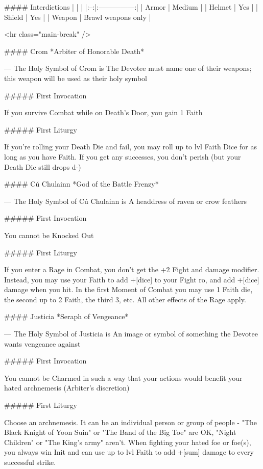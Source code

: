 #### Interdictions
| | |
|:--:|:---------------:|
| Armor | Medium |
| Helmet | Yes |
| Shield | Yes |
| Weapon | Brawl weapons only |

<hr class="main-break" />

#### Crom
*Arbiter of Honorable Death*

---
The Holy Symbol of Crom is The Devotee must name one of their weapons; this weapon will be used as their holy symbol

##### First Invocation

If you survive Combat while on Death's Door, you gain 1 Faith

##### First Liturgy

If you're rolling your Death Die and fail, you may roll up to {lvl} Faith Dice for as long as you have Faith.  If you get any successes, you don't perish (but your Death Die still drops {d-})




#### Cú Chulainn
*God of the Battle Frenzy*

---
The Holy Symbol of Cú Chulainn is A headdress of raven or crow feathers

##### First Invocation

You cannot be Knocked Out

##### First Liturgy

If you enter a Rage in Combat, you don't get the +2 Fight and damage modifier.  Instead, you may use your Faith to add +[dice] to your Fight {ro}, and add +[dice] damage when you hit.  In the first Moment of Combat you may use 1 Faith die, the second up to 2 Faith, the third 3, etc. All other effects of the Rage apply.




#### Justicia
*Seraph of Vengeance*

---
The Holy Symbol of Justicia is An image or symbol of something the Devotee wants vengeance against

##### First Invocation

You cannot be Charmed in such a way that your actions would benefit your hated archnemesis (Arbiter's discretion)

##### First Liturgy

Choose an archnemesis.  It can be an individual person or group of people  - "The Black Knight of Yoon Suin" or "The Band of the Big Toe" are OK,  "Night Children" or "The King's army" aren't.   When fighting your hated foe or foe(s), you always win Init and can use up to {lvl} Faith to add +[sum] damage to every successful strike. 





